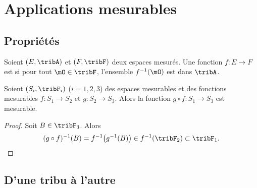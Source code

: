 
\section{Applications mesurables}

\subsection{Propriétés}

\begin{definition} \label{DefQKjDSeC}
	Soient \( (E,\tribA)\) et \( (F,\tribF)\) deux espaces mesurés. Une fonction \( f\colon E\to F\) est  si pour tout \( \mO\in \tribF\), l'ensemble \( f^{-1}(\mO)\) est dans \( \tribA\).
\end{definition}

\begin{proposition}     \label{PROPooEFHKooARJBwW}
	Soient \( (S_i,\tribF_i)\) (\( i=1,2,3\)) des espaces mesurables et des fonctions mesurables \( f\colon S_1\to S_2\) et \( g\colon S_2\to S_3\). Alors la fonction \( g\circ f\colon S_1\to S_3\) est mesurable.
\end{proposition}

\begin{proof}
	Soit \( B\in\tribF_3\). Alors
	\begin{equation}
		(g\circ f)^{-1}(B)=f^{-1}\big( g^{-1}(B) \big)\in f^{-1}(\tribF_2)\subset\tribF_1.
	\end{equation}
\end{proof}

\subsection{D'une tribu à l'autre}

